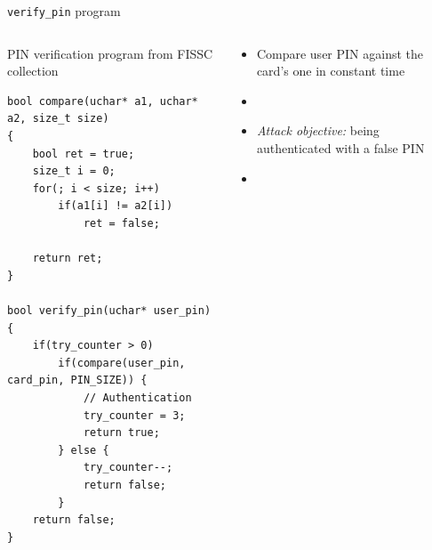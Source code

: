 \begin{frame}[fragile]{\texttt{verify\_pin} program}
    \begin{columns}
        \begin{column}{0.55\textwidth}
            \begin{small}
                PIN verification program from FISSC \cite{Dureuil/PPLCC16} collection                
            \end{small}
            
            \vspace{0.2cm}
            
            \lstset{style=customc}
            \begin{lstlisting}
bool compare(uchar* a1, uchar* a2, size_t size)
{
    bool ret = true;
    size_t i = 0; 
    for(; i < size; i++)
        if(a1[i] != a2[i])
            ret = false;
        
    return ret;
}

bool verify_pin(uchar* user_pin) {
    if(try_counter > 0)  
        if(compare(user_pin, card_pin, PIN_SIZE)) {
            // Authentication
            try_counter = 3;
            return true;
        } else {
            try_counter--;
            return false;
        }
    return false;
}
            \end{lstlisting}	
        	\vfill
        \end{column}
        \begin{column}{0.45\textwidth}
        	\begin{small}
                 \begin{itemize}
                     \item Compare user PIN against the card's one in constant time
                     \item[] 
                     \item \textit{Attack objective:} being authenticated with a false PIN
                     \item[]
                 \end{itemize}
    	    \end{small}
            \vfill
        \end{column}
    \end{columns}
\end{frame}

